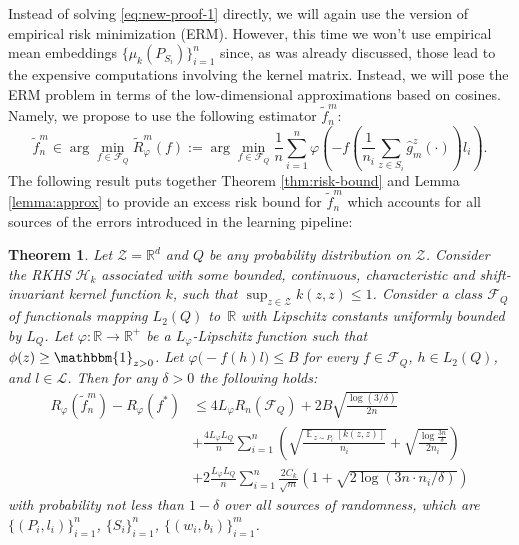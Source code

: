 \documentclass{article}
\newtheorem{theorem}{Theorem}
\DeclareMathOperator*{\E}{\mathbb{E}\,}
\renewcommand{\H}{\mathcal{H}}
\newcommand{\F}{\mathcal{F}}
\newcommand{\Z}{\mathcal{Z}}
\newcommand{\R}{\mathbb{R}}
\renewcommand{\L}{\mathcal{L}}
\newcommand{\Rp}{R_{\varphi}}
\newcommand{\Rpnt}{\tilde{R}_{\varphi}}
\newcommand{\f}{f^*}
\newcommand{\fnt}{\tilde{f}_n}
\begin{document}
Instead of solving \eqref{eq:new-proof-1} directly, we will again use the version of empirical risk minimization (ERM).
However, this time we won't use empirical mean embeddings $\{\mu_k(P_{S_i})\}_{i=1}^n$ 
since, as was already discussed, those lead to the expensive computations involving the kernel matrix.
Instead, we will pose the ERM problem in terms of the low-dimensional approximations based on cosines.
Namely, we propose to use the following estimator $\fnt^m$:
\begin{equation*}
\fnt^m \in \arg\min_{f\in \F_Q} \Rpnt^m(f):= \arg\min_{f\in \F_Q} \frac{1}{n}\sum_{i=1}^n\varphi\left(-f\left(\frac{1}{n_i}\sum_{z\in S_i}\hat{g}_m^{z}(\cdot)\right)l_i\right).
\end{equation*}
The following result puts together Theorem \ref{thm:risk-bound} and Lemma \ref{lemma:approx} to provide an excess risk bound for $\fnt^m$ which accounts for all sources of the errors introduced in the learning pipeline:
\begin{theorem}
\label{thm:new-theorem}
Let $\Z=\R^d$
and $Q$ be any probability distribution on $\Z$.
Consider the RKHS $\H_k$ associated with some bounded, continuous,
characteristic and shift-invariant kernel function $k$, such that $\sup_{z \in \Z} k(z,z)\leq 1$.
Consider a class $\F_Q$ of functionals mapping $L_2(Q)$ to~$\R$ with Lipschitz
constants uniformly bounded by $L_{Q}$.  Let $\varphi\colon \R\to\R^+$ be a
$L_{\varphi}$-Lipschitz function such that $\phi(z) \geq \mathbbm{1}_{z>0}$.
Let $\varphi\bigl(-f(h) l\bigr) \leq B$ for every $f\in\F_Q$, $h \in L_2(Q)$, and
$l\in\L$.  
Then for any $\delta > 0$ the following holds:
\begin{align*}
\Rp(\fnt^m) - \Rp(\f)
&\leq
4 L_\varphi R_n(\F_Q) + 2B\sqrt{\frac{\log(3/\delta)}{2n}}\\
&+
\frac{4L_\varphi L_{Q}}{n}
\sum_{i=1}^n
\left(
\sqrt{\frac{\E_{z\sim P_i}[k(z,z)]}{n_i}} + \sqrt{\frac{\log\frac{3n}{\delta}}{2n_i}}
\right)\\
&+
2\frac{L_{\varphi}L_Q}{n}\sum_{i=1}^n
\frac{2C_k}{\sqrt{m}}\left(1 + \sqrt{{2\log(3n\cdot n_i/\delta)}}\right)
\end{align*}
with probability not less than $1-\delta$ over all sources of
randomness, which are $\{(P_i,l_i)\}_{i=1}^n$, $\{S_i\}_{i=1}^n$, $\{(w_i,b_i)\}_{i=1}^m$.
\end{theorem}
\end{document}
